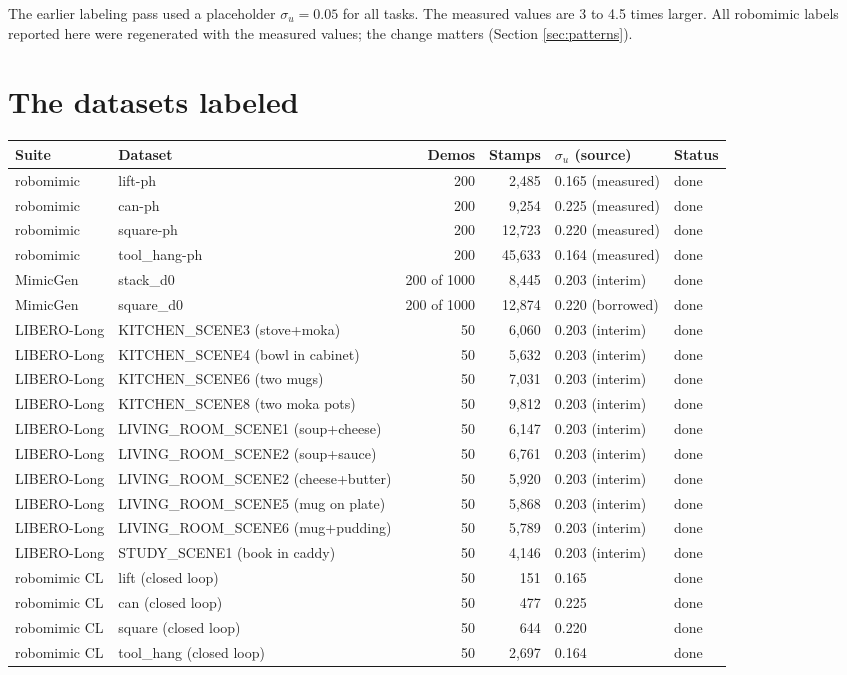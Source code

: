 \documentclass[11pt]{article}
\begin{document}
The earlier labeling pass used a placeholder $\sigma_u = 0.05$ for all tasks. The
measured values are 3 to 4.5 times larger. All robomimic labels reported here were
regenerated with the measured values; the change matters (Section
\ref{sec:patterns}).

\section{The datasets labeled}

\begin{center}
\footnotesize
\begin{tabular}{@{}llrrll@{}}
\toprule
Suite & Dataset & Demos & Stamps & $\sigma_u$ (source) & Status \\
\midrule
robomimic & lift-ph & 200 & 2{,}485 & 0.165 (measured) & done \\
robomimic & can-ph & 200 & 9{,}254 & 0.225 (measured) & done \\
robomimic & square-ph & 200 & 12{,}723 & 0.220 (measured) & done \\
robomimic & tool\_hang-ph & 200 & 45{,}633 & 0.164 (measured) & done \\
MimicGen & stack\_d0 & 200 of 1000 & 8{,}445 & 0.203 (interim) & done \\
MimicGen & square\_d0 & 200 of 1000 & 12{,}874 & 0.220 (borrowed) & done \\
LIBERO-Long & KITCHEN\_SCENE3 (stove+moka) & 50 & 6{,}060 & 0.203 (interim) & done \\
LIBERO-Long & KITCHEN\_SCENE4 (bowl in cabinet) & 50 & 5{,}632 & 0.203 (interim) & done \\
LIBERO-Long & KITCHEN\_SCENE6 (two mugs) & 50 & 7{,}031 & 0.203 (interim) & done \\
LIBERO-Long & KITCHEN\_SCENE8 (two moka pots) & 50 & 9{,}812 & 0.203 (interim) & done \\
LIBERO-Long & LIVING\_ROOM\_SCENE1 (soup+cheese) & 50 & 6{,}147 & 0.203 (interim) & done \\
LIBERO-Long & LIVING\_ROOM\_SCENE2 (soup+sauce) & 50 & 6{,}761 & 0.203 (interim) & done \\
LIBERO-Long & LIVING\_ROOM\_SCENE2 (cheese+butter) & 50 & 5{,}920 & 0.203 (interim) & done \\
LIBERO-Long & LIVING\_ROOM\_SCENE5 (mug on plate) & 50 & 5{,}868 & 0.203 (interim) & done \\
LIBERO-Long & LIVING\_ROOM\_SCENE6 (mug+pudding) & 50 & 5{,}789 & 0.203 (interim) & done \\
LIBERO-Long & STUDY\_SCENE1 (book in caddy) & 50 & 4{,}146 & 0.203 (interim) & done \\
robomimic CL & lift (closed loop) & 50 & 151 & 0.165 & done \\
robomimic CL & can (closed loop) & 50 & 477 & 0.225 & done \\
robomimic CL & square (closed loop) & 50 & 644 & 0.220 & done \\
robomimic CL & tool\_hang (closed loop) & 50 & 2{,}697 & 0.164 & done \\
\bottomrule
\end{tabular}
\end{center}
\end{document}
